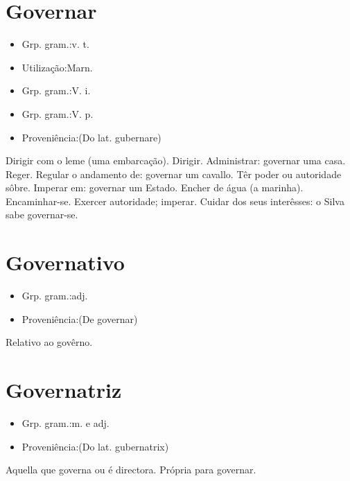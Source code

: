 \section{Governar}
\begin{itemize}
\item {Grp. gram.:v. t.}
\end{itemize}
\begin{itemize}
\item {Utilização:Marn.}
\end{itemize}
\begin{itemize}
\item {Grp. gram.:V. i.}
\end{itemize}
\begin{itemize}
\item {Grp. gram.:V. p.}
\end{itemize}
\begin{itemize}
\item {Proveniência:(Do lat. \textunderscore gubernare\textunderscore )}
\end{itemize}
Dirigir com o leme (uma embarcação).
Dirigir.
Administrar: \textunderscore governar uma casa\textunderscore .
Reger.
Regular o andamento de: \textunderscore governar um cavallo\textunderscore .
Têr poder ou autoridade sôbre.
Imperar em: \textunderscore governar um Estado\textunderscore .
Encher de água (a marinha).
Encaminhar-se.
Exercer autoridade; imperar.
Cuidar dos seus interêsses: \textunderscore o Silva sabe governar-se\textunderscore .
\section{Governativo}
\begin{itemize}
\item {Grp. gram.:adj.}
\end{itemize}
\begin{itemize}
\item {Proveniência:(De \textunderscore governar\textunderscore )}
\end{itemize}
Relativo ao govêrno.
\section{Governatriz}
\begin{itemize}
\item {Grp. gram.:m.  e  adj.}
\end{itemize}
\begin{itemize}
\item {Proveniência:(Do lat. \textunderscore gubernatrix\textunderscore )}
\end{itemize}
Aquella que governa ou é directora.
Própria para governar.
